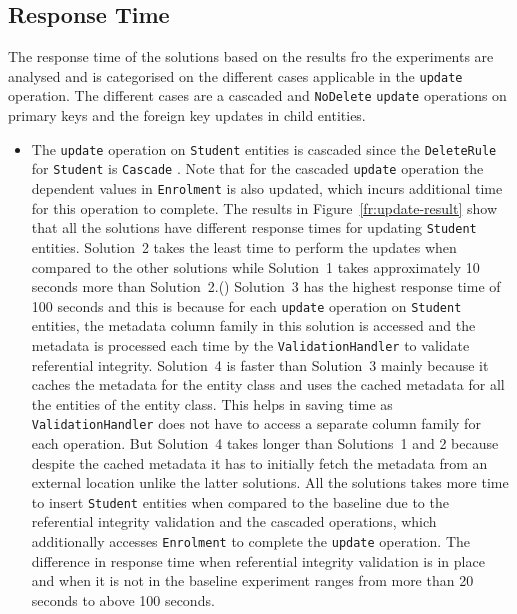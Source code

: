 	\subsection{Response Time}
	The response time of the solutions based on the results fro the experiments are
	analysed and is categorised on the different cases applicable in the
	\texttt{update} operation. The different cases are a cascaded
	and \texttt{NoDelete} \texttt{update} operations on primary keys and 
	the foreign key updates in child entities.
	
	
	\begin{itemize}
	  \item The \texttt{update} operation on \texttt{Student} entities is
	  cascaded since the \texttt{DeleteRule} for \texttt{Student} is
	  \texttt{Cascade} . Note that for the cascaded \texttt{update} operation
	  the dependent values in \texttt{Enrolment} is also updated, 
	  which incurs additional time for this operation to complete.
	The results in Figure~\ref{fr:update-result} show that all the solutions have
	different response times for updating \texttt{Student} entities.
	Solution~2 takes the least time to perform the updates when compared to the
	other solutions while Solution~1 takes approximately 10 seconds more than
	Solution~2.() Solution~3 has the highest response
	time of 100 seconds and this is because for each \texttt{update} operation
	on \texttt{Student} entities, the metadata column family in this solution is
	accessed and the metadata is processed each time by the
	\texttt{ValidationHandler} to validate referential integrity. Solution~4 is
	faster than Solution~3 mainly because it caches the metadata for the entity
	class and uses the cached metadata for all the entities of the entity class.
	This helps in saving time as \texttt{ValidationHandler} does not have to access
	a separate column family for each operation.  
	But Solution~4 takes longer than Solutions~1 and 2 because despite the cached
	metadata it has to initially fetch the metadata from an external location unlike
	the latter solutions. 
	All the solutions takes more time to insert \texttt{Student} entities when compared to
	the baseline due to the referential integrity validation and the cascaded
	operations, which additionally accesses \texttt{Enrolment} to complete the
	\texttt{update} operation. The difference in response time when referential
	integrity validation is in place and when it is not in the baseline experiment
	ranges from more than 20 seconds to above 100 seconds.
	

\end{itemize}
